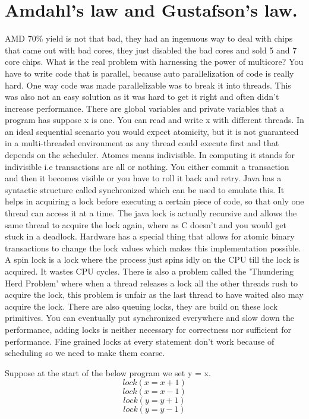 \documentclass[twoside]{article}
\begin{document}
\section{Amdahl's law and Gustafson's law.}
 AMD 70\% yield is not that bad, they had an ingenuous way to deal with chips that came out with bad cores, they just disabled the bad cores and sold 5 and 7 core chips. What is the real problem with harnessing the power of multicore? You have to write code that is parallel, because auto parallelization of code is really hard. One way code was made parallelizable was to break it into threads. This was also not an easy solution as it was hard to get it right and often didn't increase performance. There are global variables and private variables that a program has suppose x is one. You can read and write x with different threads. In an ideal sequential scenario you would expect atomicity, but it is not guaranteed in a multi-threaded environment as any thread could execute first and that depends on the scheduler. Atomes means indivisible. In computing it stands for indivisible i.e transactions are all or nothing. You either commit a transaction and then it becomes visible or you have to roll it back and retry. Java has a syntactic structure called synchronized which can be used to emulate this. It helps in acquiring a lock before executing a certain piece of code, so that only one thread can access it at a time. The java lock is actually recursive and allows the same thread to acquire the lock again, where as C doesn't and you would get stuck in a deadlock. Hardware has a special thing that allows for atomic binary transactions to change the lock values which makes this implementation possible. A spin lock is a lock where the process just spins idly on the CPU till the lock is acquired. It wastes CPU cycles. There is also a problem called the 'Thundering Herd Problem' where when a thread releases a lock all the other threads rush to acquire the lock, this problem is unfair as the last thread to have waited also may acquire the lock. There are also queuing locks, they are build on these lock primitives. You can eventually put synchronized everywhere and slow down the performance, adding locks is neither necessary for correctness nor sufficient for performance. Fine grained locks at every statement don't work because of scheduling so we need to make them coarse.  
 
 Suppose at the start of the below program we set y = x.
\[lock (x = x+1)\]  
\[lock(x = x - 1)\] 
\[lock (y = y+1)\]
\[lock(y = y - 1)\]
\end{document}
